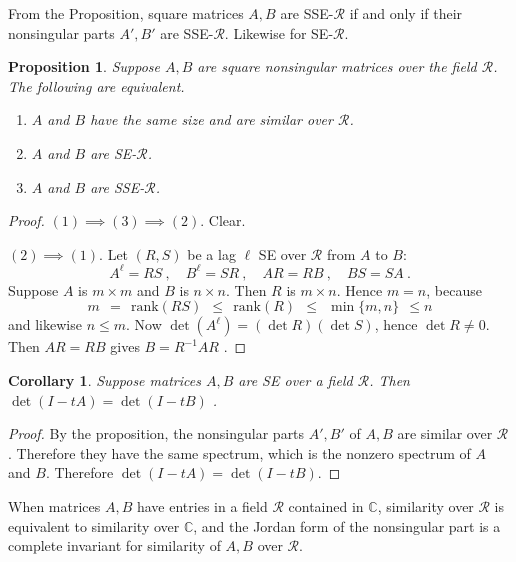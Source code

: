 \documentclass{amsart}
\newcommand{\si}{\index}
\newtheorem{prop}[equation]{Proposition}
\newtheorem{coro}[equation]{Corollary}
\theoremstyle{definition}
\theoremstyle{definition}
\newcommand{\C}{\mathbb C}
\numberwithin{equation}{subsection}
\begin{document}
From the Proposition, square matrices  $A,B$ are
    SSE-$\mathcal R$
    if and only if their  nonsingular parts $A',B'$ are SSE-$\mathcal R$.
    Likewise for SE-$\mathcal R$.
\begin{prop}
Suppose $A,B$ are square nonsingular matrices over
        the field $\mathcal R$. The following are equivalent.
\begin{enumerate}
\item $A$ and $B$ have the same size and are similar over $\mathcal R$.

\item $A$ and $B$ are SE-$\mathcal R$.

\item $A$ and $B$ are SSE-$\mathcal R$.
\end{enumerate}
\end{prop}
\begin{proof}
        $(1) \implies (3) \implies (2)$. Clear.

          $(2) \implies (1)$.
  Let $(R,S)$ be  a lag\si{lag} $\ell $ SE over $\mathcal R$ from $A$ to $B$:
  \[
  A^{\ell} =RS\ ,\quad  B^{\ell} =SR\ ,\quad  AR=RB\ ,\quad  BS=SA\ .
  \]
  Suppose  $A$ is $m\times m$ and  $B$ is $n\times n$.
  Then $R$ is $m\times n$.
  Hence $m=n$, because
  \[
  m \ \ = \ \  \text{rank}(RS) \ \  \leq  \ \ \text{rank}(R)  \ \
  \leq  \ \ \min \{ m,n \}  \ \ \leq n
  \]
and likewise $n \leq m$.
Now $\det(A^{\ell}) =(\det R)( \det S)$, hence
$\det R \neq 0$.
Then $AR=RB$ gives $B=R^{-1}AR$ .
\end{proof}

\begin{coro}
Suppose matrices $A,B$ are SE over a field $\mathcal R$.
Then
 $\det(I-tA) = \det (I-tB)$ .
\end{coro}
\begin{proof}
By the proposition, the nonsingular parts
      $A',B'$ of $A,B$ are similar over $\mathcal R$.
      Therefore they have the same spectrum, which is the nonzero\si{nonzero spectrum}
      spectrum of $A$ and $B$. Therefore
            $\det (I-tA)= \det(I-tB)$.
\end{proof}


     When matrices
     $A,B$ have entries in a field $\mathcal R$  contained in $\C$,
     similarity over $\mathcal R$ is equivalent to
     similarity over $\C$, and the Jordan form of
the nonsingular part is a complete invariant for similarity of
     $A,B$ over $\mathcal R$.
\end{document}
